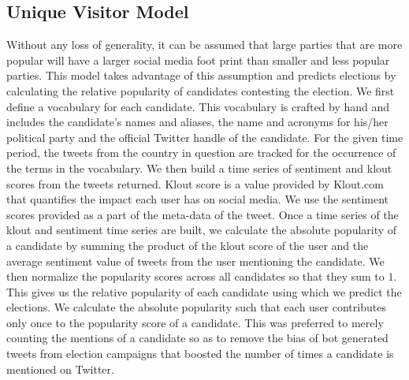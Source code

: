 \subsection{Unique Visitor Model}
Without any loss of generality, it can be assumed that large parties that are more popular will have a larger social media foot print than smaller and less popular parties. 
This model takes advantage of this assumption and predicts elections by calculating the relative popularity of candidates contesting the election.
We first define a vocabulary for each candidate. 
This vocabulary is crafted by hand and includes the candidate's names and aliases, the name and acronyms for his/her political party and the official Twitter handle of the candidate.
For the given time period, the tweets from the country in question are tracked for the occurrence of the terms in the vocabulary.
We then build a time series of sentiment and klout scores from the tweets returned.
Klout score is a value provided by Klout.com that quantifies the impact each user has on social media. 
We use the sentiment scores provided as a part of the meta-data of the tweet. 
Once a time series of the klout and sentiment time series are built, we calculate the absolute popularity of a candidate by summing the product of the klout score of the user and the average sentiment value of tweets from the user mentioning the candidate.
We then normalize the popularity scores across all candidates so that they sum to $1$.
This gives us the relative popularity of each candidate %
using which we predict the elections.
We calculate the absolute popularity such that each user contributes only once to the popularity score of a candidate.
This was preferred to merely counting the mentions of a candidate so as to remove the bias of bot generated tweets from election campaigns that boosted the number of times a candidate is mentioned on Twitter.
